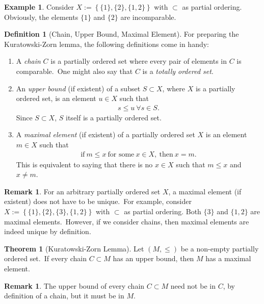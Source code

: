 \documentclass[12pt, a4paper]{article}
\numberwithin{equation}{section}
\theoremstyle{definition}
\theoremstyle{definition}
\newtheorem{defn}[thm]{Definition} %
\newtheorem{exmp}[thm]{Example} %
\newtheorem{remark}[thm]{Remark} %
\newtheorem{theorem}[thm]{Theorem}
\begin{document}
	\begin{exmp}
		Consider $X := \left\{\{1\}, \{2\}, \{1, 2\}\right\}$ with $\subset$ as partial ordering. Obviously, the elements $\{1\}$ and $\{2\}$ are incomparable. 
	\end{exmp}

	\begin{defn}[Chain, Upper Bound, Maximal Element]
	For preparing the Kuratowski-Zorn lemma, the following definitions come in handy: 
		\begin{enumerate}[label=\alph*)]
			\item A \textit{chain} $C$ is a partially ordered set where every pair of elements in $C$ is comparable.\ One might also say that $C$ is a \textit{totally ordered set}. 
			\item An \textit{upper bound} (if existent)  of a subset $S\subset X$, where $X$ is a partially ordered set, is an element $u\in X$ such that 
			\begin{align}
				s \leq u \ \forall s\in S. 
			\end{align}
			Since $S\subset X$, $S$ itself is a partially ordered set. 
			\item A \textit{maximal element} (if existent) of a partially ordered set $X$ is an element $m\in X$ such that 
			\begin{align}
				\text{if}\ m\leq x \ \text{for some}\ x\in X,\ \text{then}\ x=m.
			\end{align}
			This is equivalent to saying that there is no $x\in X$ such that $m\leq x$ and $x\ne m$. 
		\end{enumerate}
	\end{defn}

	\begin{remark}
		For an arbitrary partially ordered set $X$, a maximal element (if existent) does not have to be unique.\ For example, consider $X := \left\{ \{1\}, \{2\}, \{3\}, \{1, 2\} \right\}$ with $\subset$ as partial ordering. Both $\{3\}$ and $\{1, 2\}$ are maximal elements.\ However, if we consider chains, then maximal elements are indeed unique by definition. 
	\end{remark}

	\begin{theorem}[Kuratowski-Zorn Lemma]
		Let $\left(M, \leq\right)$ be a non-empty partially ordered set.\ If every chain $C\subset M$ has an upper bound, then $M$ has a maximal element. 
	\end{theorem}

	\begin{remark}
		The upper bound of every chain $C\subset M$ need not be in $C$, by definition of a chain, but it must be in $M$. 
	\end{remark}
	
\end{document}
